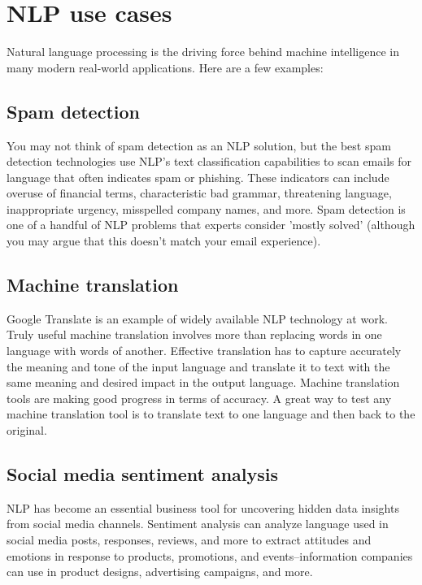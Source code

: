 \documentclass[11pt]{article}
\begin{document}
\clearpage

\section{NLP use cases}
\label{sec:org01c1f8b}
Natural language processing is the driving force behind machine intelligence in
many modern real-world applications. Here are a few examples:
\subsection{Spam detection}
\label{sec:orgae9c331}
You may not think of spam detection as an NLP solution, but the best spam detection
technologies use NLP's text classification capabilities to scan emails for language
that often indicates spam or phishing. These indicators can include overuse of
financial terms, characteristic bad grammar, threatening language, inappropriate
urgency, misspelled company names, and more. Spam detection is one of a handful
of NLP problems that experts consider 'mostly solved' (although you may argue that
this doesn’t match your email experience).

\subsection{Machine translation}
\label{sec:orgf03e041}
Google Translate is an example of widely available NLP technology at work.
Truly useful machine translation involves more than replacing words in one language
with words of another.  Effective translation has to capture accurately the meaning
and tone of the input language and translate it to text with the same meaning and
desired impact in the output language. Machine translation tools are making good
progress in terms of accuracy. A great way to test any machine translation tool is
to translate text to one language and then back to the original.

\subsection{Social media sentiment analysis}
\label{sec:org428b9e5}
NLP has become an essential business tool for uncovering hidden data insights from
social media channels. Sentiment analysis can analyze language used in social media
posts, responses, reviews, and more to extract attitudes and emotions in response
to products, promotions, and events–information companies can use in product designs,
advertising campaigns, and more.
\end{document}
